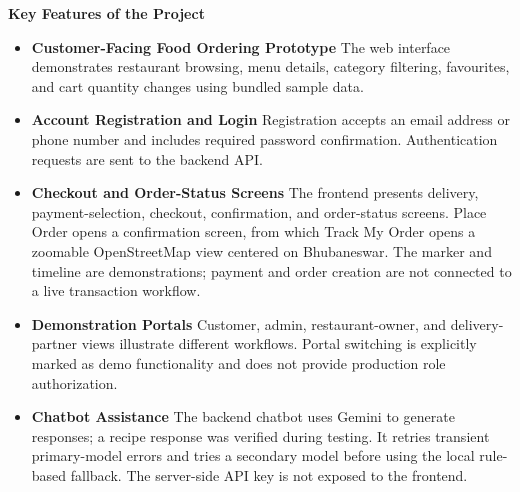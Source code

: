 \begin{center}

\Large{\textbf{Key Features of the Project}}

\vspace{5mm}

\end{center}

\justifying

\begin{itemize}

    \item \textbf{Customer-Facing Food Ordering Prototype}
    The web interface demonstrates restaurant browsing, menu details, category filtering, favourites, and cart quantity changes using bundled sample data.
    \vspace{0.3cm}

    \item \textbf{Account Registration and Login}
    Registration accepts an email address or phone number and includes required password confirmation. Authentication requests are sent to the backend API.
    \vspace{0.3cm}

    \item \textbf{Checkout and Order-Status Screens}
    The frontend presents delivery, payment-selection, checkout, confirmation, and order-status screens. Place Order opens a confirmation screen, from which Track My Order opens a zoomable OpenStreetMap view centered on Bhubaneswar. The marker and timeline are demonstrations; payment and order creation are not connected to a live transaction workflow.
    \vspace{0.3cm}

    \item \textbf{Demonstration Portals}
    Customer, admin, restaurant-owner, and delivery-partner views illustrate different workflows. Portal switching is explicitly marked as demo functionality and does not provide production role authorization.
    \vspace{0.3cm}

    \item \textbf{Chatbot Assistance}
    The backend chatbot uses Gemini to generate responses; a recipe response was verified during testing. It retries transient primary-model errors and tries a secondary model before using the local rule-based fallback. The server-side API key is not exposed to the frontend.
    \vspace{0.3cm}


\end{itemize}
